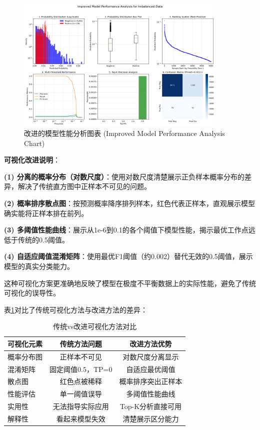 \documentclass[12pt,a4paper]{article}
\begin{document}
\begin{figure}[H]
\centering
\includegraphics[width=0.9\textwidth]{improved_analysis_en.png}
\caption{改进的模型性能分析图表 (Improved Model Performance Analysis Chart)}
\label{fig:improved_analysis}
\end{figure}

\textbf{可视化改进说明}：

\textbf{(1) 分离的概率分布（对数尺度）}：使用对数尺度清楚展示正负样本概率分布的差异，解决了传统直方图中正样本不可见的问题。

\textbf{(2) 概率排序散点图}：按预测概率降序排列样本，红色代表正样本，直观展示模型确实能将正样本排在前列。

\textbf{(3) 多阈值性能曲线}：展示从1e-6到0.1的各个阈值下模型性能，揭示最优工作点远低于传统的0.5阈值。

\textbf{(4) 自适应阈值混淆矩阵}：使用最优F1阈值（约0.002）替代无效的0.5阈值，展示模型的真实分类能力。

这种可视化方案更准确地反映了模型在极度不平衡数据上的实际性能，避免了传统可视化的误导性。

表\ref{tab:visualization_comparison}对比了传统可视化方法与改进方法的差异：

\begin{table}[H]
\centering
\caption{传统vs改进可视化方法对比}
\label{tab:visualization_comparison}
\begin{tabular}{lcc}
\toprule
可视化元素 & 传统方法问题 & 改进方法优势 \\
\midrule
概率分布图 & 正样本不可见 & 对数尺度分离显示 \\
混淆矩阵 & 固定阈值0.5，TP=0 & 自适应最优阈值 \\
散点图 & 红色点被稀释 & 概率排序突出正样本 \\
性能评估 & 单一阈值误导 & 多阈值性能曲线 \\
实用性 & 无法指导实际应用 & Top-K分析直接可用 \\
解释性 & 看起来模型失效 & 清楚展示区分能力 \\
\bottomrule
\end{tabular}
\end{table}
\end{document}
